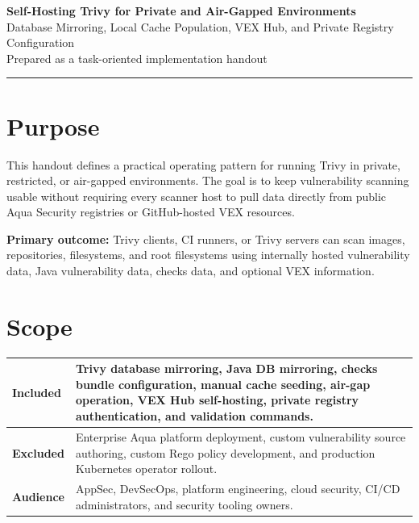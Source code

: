 \documentclass[10pt]{article}
\begin{document}
\begin{center}
  {\LARGE \bfseries \color{navy} Self-Hosting Trivy for Private and Air-Gapped Environments}\\[0.35em]
  {\large Database Mirroring, Local Cache Population, VEX Hub, and Private Registry Configuration}\\[0.5em]
  {\small Prepared as a task-oriented implementation handout}
\end{center}

\vspace{0.3em}
\hrule
\vspace{0.8em}

\section{Purpose}
This handout defines a practical operating pattern for running Trivy in private, restricted, or air-gapped environments. The goal is to keep vulnerability scanning usable without requiring every scanner host to pull data directly from public Aqua Security registries or GitHub-hosted VEX resources.

\textbf{Primary outcome:} Trivy clients, CI runners, or Trivy servers can scan images, repositories, filesystems, and root filesystems using internally hosted vulnerability data, Java vulnerability data, checks data, and optional VEX information.

\section{Scope}
\begin{tabularx}{\textwidth}{L{0.27\textwidth} Y}
\hline
\textbf{Included} & Trivy database mirroring, Java DB mirroring, checks bundle configuration, manual cache seeding, air-gap operation, VEX Hub self-hosting, private registry authentication, and validation commands. \\
\hline
\textbf{Excluded} & Enterprise Aqua platform deployment, custom vulnerability source authoring, custom Rego policy development, and production Kubernetes operator rollout. \\
\hline
\textbf{Audience} & AppSec, DevSecOps, platform engineering, cloud security, CI/CD administrators, and security tooling owners. \\
\hline
\end{tabularx}
\end{document}
